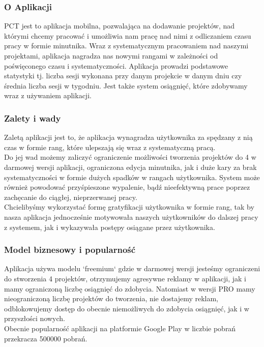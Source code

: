 \documentclass[a4paper,11pt]{report}
\begin{document}
\subsubsection{O Aplikacji}
PCT jest to aplikacja mobilna, pozwalająca na dodawanie projektów,
 nad którymi chcemy pracować i umożliwia nam pracę nad nimi z odliczaniem czasu pracy w formie minutnika.
 Wraz z systematycznym pracowaniem nad naszymi projektami,
 aplikacja nagradza nas nowymi rangami w zależności od poświęconego czasu i systematyczności.
 Aplikacja prowadzi podstawowe statystyki tj. liczba sesji wykonana przy danym projekcie w danym dniu
 czy średnia liczba sesji w tygodniu. Jest także system osiągnięć, które zdobywamy wraz z używaniem aplikacji.
\subsubsection{Zalety i wady}
Zaletą aplikacji jest to, że aplikacja wynagradza użytkownika za spędzany z nią czas w formie rang,
 które ulepszają się wraz z systematyczną pracą.
\vspace{0,5cm}
\\Do jej wad możemy zaliczyć ograniczenie możliwości tworzenia projektów do 4 w darmowej wersji aplikacji,
ograniczona edycja minutnika, jak i duże kary za brak systematyczności w formie dużych spadków w rangach użytkownika.
System może również powodować przyśpieszone wypalenie, bądź nieefektywną prace poprzez zachęcanie do ciągłej, nieprzerwanej pracy.
\vspace{0,5cm}
\\Chcielibyśmy wykorzystać formę gratyfikacji użytkownika w formie rang, tak by nasza aplikacja
 jednocześnie motywowała naszych użytkowników do dalszej pracy z systemem, jak i
 wykazywała postępy osiągane przez użytkownika.
\subsubsection{Model biznesowy i popularność}
Aplikacja używa modelu `freemium` gdzie w darmowej wersji jesteśmy ograniczeni do stworzenia 4 projektów,
 otrzymujemy agresywne reklamy w aplikacji, jak i mamy ograniczoną liczbę osiągnięć do zdobycia.
 Natomiast w wersji PRO mamy nieograniczoną liczbę projektów do tworzenia, nie dostajemy reklam,
 odblokowujemy dostęp do obecnie niemożliwych do zdobycia osiągnięć, jak i w przyszłości nowych.
\vspace{0,5cm}\\
Obecnie popularność aplikacji na platformie Google Play w liczbie pobrań przekracza 500000 pobrań.
\end{document}
